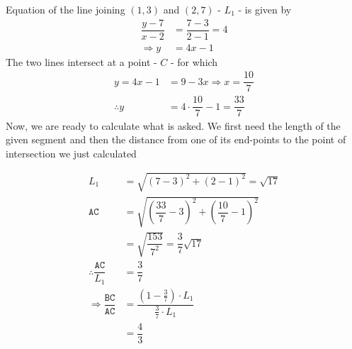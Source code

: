 \begin{solution}
	Equation of the line joining $(1,3)$ and $(2,7)$ - $L_1$ - is given by 
	\begin{align}
		\dfrac{y-7}{x-2} &= \dfrac{7-3}{2-1} = 4 \\
		\Rightarrow y &= 4x - 1
	\end{align}
	The two lines intersect at a point - $C$ - for which
	\begin{align}
		y = 4x - 1 &= 9-3x \Rightarrow x = \dfrac{10}{7} \\
		\therefore y &= 4\cdot\dfrac{10}{7}-1 = \dfrac{33}{7}
	\end{align}
	Now, we are ready to calculate what is asked. We first need the length
	of the given segment and then the distance from one of its end-points to
	the point of intersection we just calculated 
	
	\begin{align}
		\texttt{$L_1$} &= \sqrt{(7-3)^2+(2-1)^2} = \sqrt{17} \\
		\texttt{AC} &= \sqrt{(\dfrac{33}{7}-3)^2+(\dfrac{10}{7}-1)^2} \\
		&= \sqrt{\dfrac{153}{7^2}} = \dfrac{3}{7}\sqrt{17} \\
		\therefore\dfrac{\texttt{AC}}{L_1} &= \dfrac{3}{7} \\
		\Rightarrow\dfrac{\texttt{BC}}{\texttt{AC}} &= \dfrac{(1-\frac{3}{7})\cdot L_1}{\frac{3}{7}\cdot L_1}\\
		&= \dfrac{4}{3}
	\end{align}
	
\end{solution}
